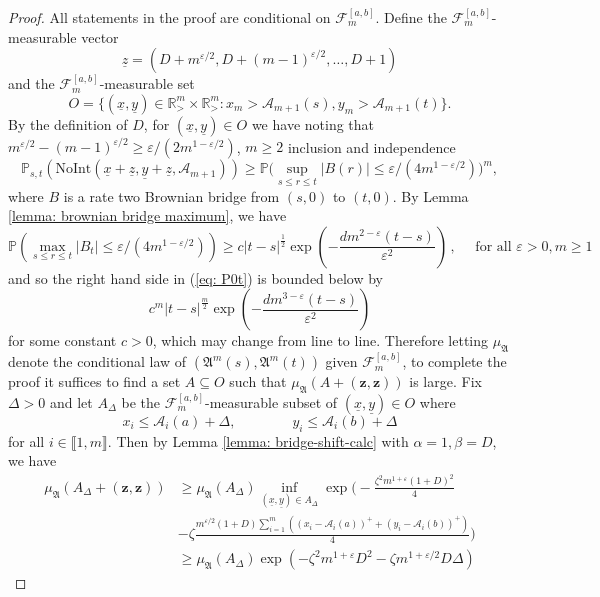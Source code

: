 \documentclass[11pt, reqno]{amsart}
\numberwithin{equation}{section}
\newcommand{\R}{\ensuremath{\mathbb{R}}}
\newcommand{\PP}{\ensuremath{\mathbb{P}}}
\begin{document}
\begin{proof}
    All statements in the proof are conditional on $\mathscr{F}^{[a, b]}_m$. Define the $\mathscr{F}^{[a, b]}_m$-measurable vector 
	$$
	\underline{z} = (D + m^{\varepsilon/2}, D + (m-1)^{\varepsilon/2}, \dots, D + 1)
	$$
and the $\mathscr{F}^{[a, b]}_m$-measurable set
\begin{equation}
\label{eq: x-y}
O = \{(\underline{x}, \underline{y}) \in \R^m_> \times \R^m_> : x_m > \mathcal{A}_{m+1}(s), y_m > \mathcal{A}_{m+1}(t) \}.
\end{equation} 
By the definition of $D$, for $(\underline{x}, \underline{y}) \in O$ we have noting that $m^{\varepsilon/2}-(m-1)^{\varepsilon/2}\ge \varepsilon/(2m^{1-\varepsilon/2})$, $m\ge 2$ inclusion and independence
\begin{equation}
\label{eq: P0t}
\PP_{s, t}(\mathrm{NoInt}(\underline{x} + \underline{z}, \underline{y} + \underline{z}, \mathcal{A}_{m+1})) \ge \PP\Big (\sup_{s \le r \le t} |B(r)| \le \varepsilon/(4m^{1-\varepsilon/2})\Big)^m,
\end{equation}
where $B$ is a rate two Brownian bridge from $(s,0)$ to $(t, 0)$. By Lemma \ref{lemma: brownian bridge maximum}, we have 
\begin{equation*}\PP(\displaystyle\max_{s\le r\le t}|B_t|\le \varepsilon/(4m^{1-\varepsilon/2}))\ge c |t-s|^{\frac{1}{2}}\exp \left( - \frac{dm^{2-\varepsilon} (t-s)}{\varepsilon^2}\right)\,,\quad \text{ for all }\varepsilon>0, m\ge 1\end{equation*}
and so the right hand side in (\ref{eq: P0t}) is bounded below by
\begin{equation*} c^m |t-s|^{\frac{m}{2}} \exp \left( - \frac{dm^{3-\varepsilon} (t-s)}{\varepsilon^2}\right)\end{equation*}
for some constant $c>0$, which may change from line to line. Therefore letting $\mu_\mathfrak{A}$ denote the conditional law of $(\mathfrak{A}^{m}(s), \mathfrak{A}^{m}(t))$ given $\mathscr{F}^{[a, b]}_m$, to complete the proof it suffices to find a set $A \subseteq O$ such that 
$
\mu_\mathfrak{A}(A + (\mathbf{z}, \mathbf{z}))
$
is large. Fix $\Delta > 0$ and let $A_\Delta$ be the $\mathscr{F}^{[a, b]}_m$-measurable subset of $(\underline{x}, \underline{y}) \in O$  where 
$$
x_i \le \mathcal{A}_i(a) + \Delta, \qquad \qquad y_i \le \mathcal{A}_i(b) + \Delta 
$$
for all $i \in \llbracket 1, m \rrbracket$. Then by Lemma \ref{lemma: bridge-shift-calc} with $\alpha = 1, \beta = D$, we have
\begin{align}
\nonumber
\mu_\mathfrak{A}(A_\Delta + (\mathbf{z}, \mathbf{z})) &\ge \mu_\mathfrak{A}(A_\Delta) \inf_{(\underline{x}, \underline{y}) \in A_\Delta} \exp\biggl(
-\frac{\zeta^2 m^{1+\varepsilon}(1 + D)^2}{4} \\
&- \zeta \frac{m^{\varepsilon/2}(1 + D) \sum_{i=1}^m ((x_i - \mathcal{A}_i(a))^+ + (y_i - \mathcal{A}_i(b))^+)}{4}
\biggr) \\
\label{eq: mufB}
& \ge \mu_\mathfrak{A}(A_\Delta) \exp \left(-\zeta^2 m^{1+\varepsilon} D^2 - \zeta m^{1+\varepsilon/2} D \Delta \right)
\end{align}


\end{proof}
\end{document}
